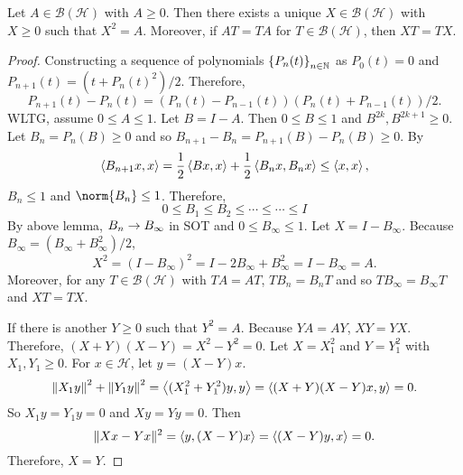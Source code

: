 \documentclass[a4paper,12pt]{article}
\begin{document}
\begin{thm}
    Let $A \in \mathcal{B}(\mathcal{H})$ with $A \geq 0$. Then there exists a unique $X \in \mathcal{B}(\mathcal{H})$ with $X \geq 0$ such that $X^2 = A$. Moreover, if $AT = TA$ for $T \in \mathcal{B}(\mathcal{H})$, then $XT = TX$.
\end{thm}
\begin{proof}
    Constructing a sequence of polynomials $\left\{P_n(t)\right\}_{n \in \mathbb{N}}$ as $P_0(t) = 0$ and $P_{n+1}(t) = (t + P_n(t)^2) / 2$. Therefore,
    \begin{equation*}
        P_{n+1}(t)-P_n(t)=\left(P_n(t)-P_{n-1}(t)\right)\left(P_n(t)+P_{n-1}(t)\right) / 2.
    \end{equation*}
    WLTG, assume $0 \leq A \leq 1$. Let $B = I - A$. Then $0 \leq B \leq 1$ and $B^{2k}, B^{2k+1} \geq 0$. Let $B_n = P_n(B) \geq 0$ and so $B_{n+1}-B_n=P_{n+1}(B)-P_n(B) \geq 0$. By
    \begin{equation*}
        \left\langle B_{n+1}x,x \right\rangle = \frac{1}{2}\left\langle Bx,x \right\rangle + \frac{1}{2} \left\langle B_nx,B_nx \right\rangle \leq \left\langle x,x \right\rangle,
    \end{equation*}
    $B_n \leq 1$ and $\norm{B_n} \leq 1$. Therefore,
    \begin{equation*}
        0 \leq B_1 \leq B_2 \leq \cdots \leq \cdots \leq I
    \end{equation*}
    By above lemma, $B_n \rightarrow B_\infty$ in SOT and $0 \leq B_\infty \leq 1$. Let $X = I - B_\infty$. Because $B_\infty = (B_\infty + B_\infty^2) / 2$,
    \begin{equation*}
        X^2=\left(I-B_{\infty}\right)^2=I-2 B_{\infty}+B_{\infty}^2=I-B_\infty=A.
    \end{equation*}
    Moreover, for any $T \in \mathcal{B}(\mathcal{H})$ with $TA = AT$, $TB_n = B_nT$ and so $TB_\infty = B_\infty T$ and $XT = TX$.

    If there is another $Y \geq 0$ such that $Y^2 = A$. Because $YA = AY$, $XY = YX$. Therefore, $(X+Y)(X-Y) = X^2- Y^2 = 0$. Let $X = X_1^2$ and $Y = Y_1^2$ with $X_1,Y_1 \geq 0$. For $x \in \mathcal{H}$, let $y = (X-Y)x$.
    \begin{equation*}
        \left\|X_1 y\right\|^2+\left\|Y_1 y\right\|^2= \left\langle (X_1^2+Y_1^2)y,y \right\rangle = \left\langle (X+Y)(X-Y)x,y \right\rangle = 0.
    \end{equation*}
    So $X_1y = Y_1y = 0$ and $Xy = Yy = 0$. Then
    \begin{equation*}
        \|X x-Y x\|^2= \left\langle y,(X-Y)x \right\rangle = \left\langle (X-Y)y,x \right\rangle = 0.
    \end{equation*}
    Therefore, $X = Y$.
\end{proof}
\end{document}
